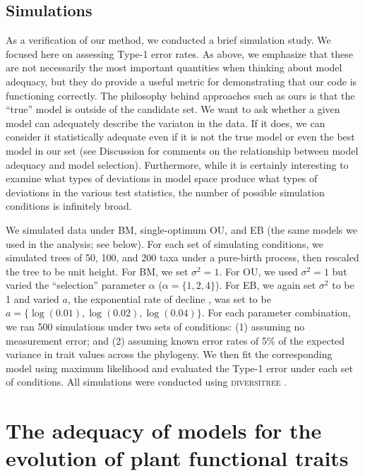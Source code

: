\subsection{Simulations}

As a verification of our method, we conducted a brief simulation study. We focused here on assessing Type-1 error rates. As above, we emphasize that these are not necessarily the most important quantities when thinking about model adequacy, but they do provide a useful metric for demonstrating that our code is functioning correctly. The philosophy behind approaches such as ours is that the ``true'' model is outside of the candidate set. We want to ask whether a given model can adequately describe the variaton in the data. If it does, we can consider it statistically adequate even if it is not the true model or even the best model in our set (see Discussion for comments on the relationship between model adequacy and model selection). Furthermore, while it is certainly interesting to examine what types of deviations in model space produce what types of deviations in the various test statistics, the number of possible simulation conditions is infinitely broad.

We simulated data under BM, single-optimum OU, and EB (the same models we used in the analysis; see below). For each set of simulating conditions, we simulated trees of 50, 100, and 200 taxa under a pure-birth process, then rescaled the tree to be unit height. For BM, we set $\sigma^2=1$. For OU, we used $\sigma^2=1$ but varied the ``selection'' parameter $\alpha$ ($\alpha=\lbrace 1,2,4 \rbrace$). For EB, we again set $\sigma^2$ to be 1 and varied $a$, the exponential rate of decline \citep[see][for details]{Harmon2010, SlaterPennell}, was set to be $a=\lbrace \log(0.01), \log(0.02), \log(0.04) \rbrace$. For each parameter combination, we ran 500 simulations under two sets of conditions: (1) assuming no measurement error; and (2) assuming known error rates of 5\% of the expected variance in trait values across the phylogeny. We then fit the corresponding model using maximum likelihood and evaluated the Type-1 error under each set of conditions. All simulations were conducted using \textsc{diversitree} \citep{FitzJohn2012}.


\section{The adequacy of models for the evolution of plant functional traits}

